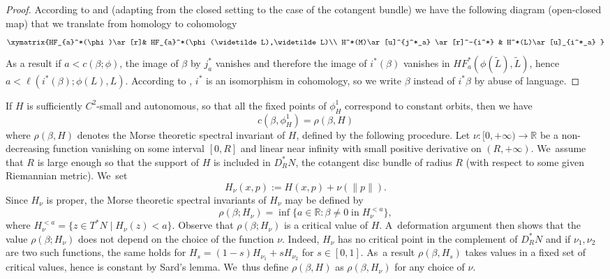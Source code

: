 \documentclass[10pt]{amsart}
\theoremstyle{definition}
\newcommand{\R}{\mathbb{R}}
\begin{document}
\begin{proof}
According to \cite[Th.\,1.5]{Albers-PSS} and \cite[Proof of Prop.\,2.9]{M-V-Z} (adapting from the closed setting to the case of the cotangent bundle) we have the following diagram (open-closed map) that we translate from homology to cohomology
\[
\xymatrix{HF_{a}^*(\phi)\ar[r]& HF_{a}^*(\phi(\widetilde L),\widetilde L)\\
H^*(M)\ar[u]^{j^*_a} \ar[r]^-{i^*} & H^*(L)\ar[u]_{i^*_a}
}
\]
As a result if $a< c(\beta;\phi)$, the image of $\beta$ by $j_a^*$ vanishes and therefore the image of $i^*(\beta)$
vanishes in $HF_{a}^*(\phi(\widetilde{L}),\widetilde{L})$, hence $a < \ell (i^*(\beta);\phi(L),L)$. According to \cite{Fukaya-Seidel-Smith, Kragh2}, $i^*$ is an isomorphism in cohomology, so we write $\beta$ instead of $i^*\beta$ by abuse of language.
\end{proof}

If $H$ is sufficiently $C^2$-small and autonomous, so that all the fixed points of $\phi_H^1$ correspond to constant orbits, then we have
\begin{equation}
\label{eq:spectral-morse}
c(\beta, \phi_H^1)=\rho(\beta, H)
\end{equation}
where $\rho(\beta, H)$ denotes the Morse theoretic spectral invariant of $H$, defined by the following procedure.
Let $\nu:[0, +\infty)\to\R$ be a non-decreasing function vanishing on some interval $[0,R]$ and linear near infinity with small positive derivative on $(R,+\infty)$. We~assume that $R$ is large enough so that the support of $H$ is included in $D_R^*N$, the cotangent disc bundle of radius $R$ (with respect to some given Riemannian metric). We~set\vspace*{-3pt}
\begin{equation}
\label{eq:H_nu}
H_\nu(x,p):=H(x,p)+\nu(\|p\|).
\end{equation}
Since $H_\nu$ is proper, the Morse theoretic spectral invariants of $H_\nu$ may be defined by\vspace*{-3pt}
\[
\rho(\beta;H_\nu)=\inf\bigl\{a\in\R: \beta \neq 0 \; \text{in}\; H_\nu^{<a} \bigr\},
\]
where $H_\nu^{<a}=\{z \in T^*N \mid H_\nu(z)<a\}$.
Observe that $\rho(\beta;H_\nu)$ is a critical value of $H$. A~deformation argument then shows that the value $\rho(\beta;H_\nu)$ does not depend on the choice of the function $\nu$. Indeed, $H_\nu$ has no critical point in the complement of $D_R^*N$ and if $\nu_1,\nu_2$ are two such functions, the same holds for $H_s=(1-s)H_{\nu_1}+s H_{\nu_2}$ for $s\in[0,1]$. As~a result $\rho(\beta,H_s)$ takes values in a fixed set of critical values, hence is constant by Sard's lemma. We~thus define $\rho(\beta, H)$ as $\rho(\beta, H_\nu)$ for any choice of $\nu$.
\end{document}
